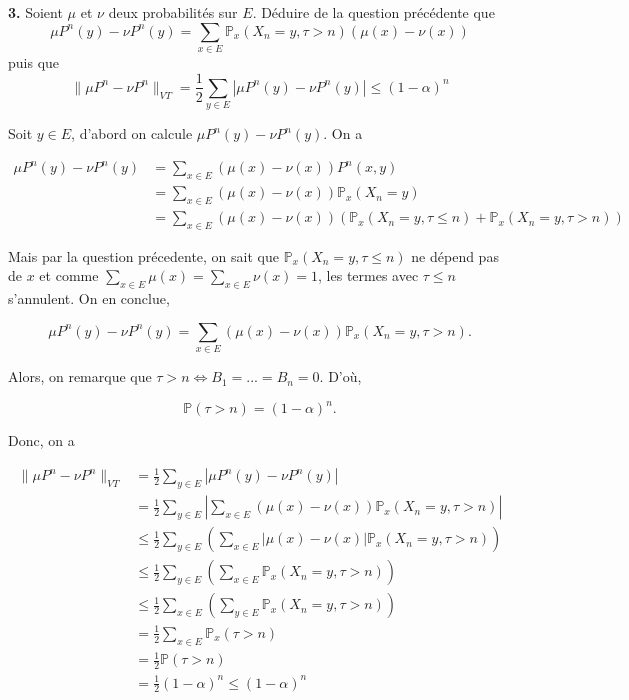 \documentclass[french]{article}
\begin{document}
	\begin{tcolorbox}[colback=gray!5!white,colframe=gray!75!black]
		\textbf{3.} Soient $\mu$ et $\nu$ deux probabilités sur $E$. Déduire de la question précédente que
		$$ \mu P^n(y) - \nu P^n(y) = \sum_{x \in E} \mathbb{P}_x(X_n = y, \tau > n)(\mu(x) - \nu(x)) $$
		puis que
		$$ \|\mu P^n - \nu P^n\|_{VT} = \frac{1}{2} \sum_{y \in E} |\mu P^n(y) - \nu P^n(y)| \leq (1 - \alpha)^n $$
	\end{tcolorbox}

	Soit $y \in E$, d'abord on calcule $\mu P^n(y) - \nu P^n(y)$. On a
	
	\begin{align}
		\mu P^n(y) - \nu P^n(y) & = \sum_{x \in E} (\mu(x) - \nu(x))P^n(x, y)\\
		&= \sum_{x \in E} (\mu(x) - \nu(x)) \mathbb{P}_x(X_n = y) \\
		&= \sum_{x \in E} (\mu(x) - \nu(x)) ( \mathbb{P}_x(X_n = y, \tau \leq n) + \mathbb{P}_x(X_n = y, \tau > n) )
	\end{align}
	
	Mais par la question précedente, on sait que $\mathbb{P}_x(X_n = y, \tau \leq n)$ ne dépend pas de $x$ et comme $\sum_{x \in E} \mu(x) = \sum_{x \in E} \nu(x) = 1$, les termes avec $\tau \leq n$ s'annulent. On en conclue,
	
	$$ \mu P^n(y) - \nu P^n(y) = \sum_{x \in E} (\mu(x) - \nu(x)) \mathbb{P}_x(X_n = y, \tau > n). $$
	
	Alors, on remarque que $\tau > n  \iff B_1=...=B_n=0$. D'où, 
	
	$$\mathbb{P}(\tau > n) = (1-\alpha)^n.$$
	
	Donc, on a
	
	\begin{align}
		\| \mu P^n - \nu P^n \|_{VT} &= \frac{1}{2} \sum_{y \in E} |\mu P^n(y) - \nu P^n(y)| \\
		&= \frac{1}{2} \sum_{y \in E} \left| \sum_{x \in E} (\mu(x) - \nu(x)) \mathbb{P}_x(X_n = y, \tau > n)\right| \\
		&\leq \frac{1}{2} \sum_{y \in E} \left(\sum_{x \in E} |\mu(x) - \nu(x)| \mathbb{P}_x(X_n = y, \tau > n)\right) \\
		&\leq \frac{1}{2} \sum_{y \in E} \left(\sum_{x \in E} \mathbb{P}_x(X_n = y, \tau > n)\right) \\
		&\leq \frac{1}{2} \sum_{x \in E} \left(\sum_{y \in E} \mathbb{P}_x(X_n = y, \tau > n)\right) \\
		&= \frac{1}{2} \sum_{x \in E} \mathbb{P}_x(\tau > n)\\
		&= \frac{1}{2} \mathbb{P}(\tau > n) \\
		&= \frac{1}{2}(1-\alpha)^n \leq (1-\alpha)^n
	\end{align}
	
\end{document}
